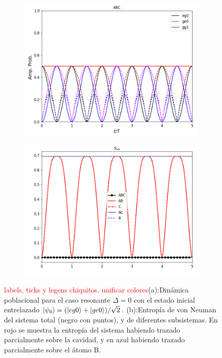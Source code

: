 \begin{figure}[h]
    \centering
    \begin{subfigure}{0.49\textwidth}
        \centering
        \includegraphics[width=\textwidth]{figuras/ch4/d eg0+ din ABC d=0.png}
        \caption{}
        \label{fig4:dinamica pob eg0 sim resonante}
    \end{subfigure}
    \hfill
    \begin{subfigure}{0.49\textwidth}
        \centering
        \includegraphics[width=\textwidth]{figuras/ch4/d eg0+ din svn d=0.png}
        \caption{}
        \label{fig4:dinamica svn eg0 sim resonante}
    \end{subfigure}
    \caption{\textcolor{red}{labels, ticks y legens chiquitos. unificar colores}(a):Dinámica poblacional para el caso resonante $\Delta=0$ con el estado inicial entrelazado $\ket{\psi_0}=(\ket{eg0} + \ket{ge0})/\sqrt{2}$. (b):Entropía de von Neuman del sistema total (negro con puntos), y de diferentes subsistemas. En rojo se muestra la entropía del sistema habiendo trazado parcialmente sobre la cavidad, y en azul habiendo trazado parcialmente sobre el átomo B.}
    \label{fig4:dinamica eg0 sim resonante}
\end{figure}

